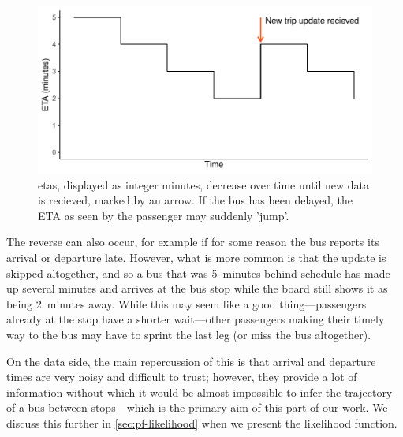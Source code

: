 \begin{knitrout}\small
{}\color{fgcolor}\begin{figure}

{\centering \includegraphics[width=.8\textwidth]{figure/tu_eta_jump-1} 

}

\caption[\glspl{eta}, displayed as integer minutes, decrease over time until new data is recieved, marked by an arrow]{\glspl{eta}, displayed as integer minutes, decrease over time until new data is recieved, marked by an arrow. If the bus has been delayed, the ETA as seen by the passenger may suddenly 'jump'.}\label{fig:tu_eta_jump}
\end{figure}


\end{knitrout}


The reverse can also occur, for example if for some reason the bus reports its arrival or departure late. However, what is more common is that the update is skipped altogether, and so a bus that was 5~minutes behind schedule has made up several minutes and arrives at the bus stop while the \rt{} board still shows it as being 2~minutes away. While this may seem like a good thing---passengers already at the stop have a shorter wait---other passengers making their timely way to the bus may have to sprint the last leg (or miss the bus altogether).


On the data side, the main repercussion of this is that arrival and departure times are very noisy and difficult to trust; however, they provide a lot of information without which it would be almost impossible to infer the trajectory of a bus between stops---which is the primary aim of this part of our work. We discuss this further in \cref{sec:pf-likelihood} when we present the likelihood function.

